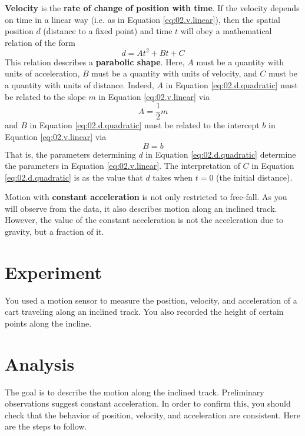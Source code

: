 \textbf{Velocity} is the \textbf{rate of change of position with time}. If the velocity depends on time in a linear way (i.e. as in Equation \ref{eq:02.v.linear}), then the spatial position $d$ (distance to a fixed point) and time $t$ will obey a mathematical relation of the form
\begin{equation}
    d = A t^{2} + B t + C
    \label{eq:02.d.quadratic}
\end{equation}
This relation describes a \textbf{parabolic shape}. Here, $A$ must be a quantity with units of acceleration, $B$ must be a quantity with units of velocity, and $C$ must be a quantity with units of distance. Indeed, $A$ in Equation \ref{eq:02.d.quadratic} must be related to the slope $m$ in Equation \ref{eq:02.v.linear} via
\begin{equation}
    A = \frac{1}{2} m
\end{equation}
and $B$ in Equation \ref{eq:02.d.quadratic} must be related to the intercept $b$ in Equation \ref{eq:02.v.linear} via
\begin{equation}
    B = b
\end{equation}
That is, the parameters determining $d$ in Equation \ref{eq:02.d.quadratic} determine the parameters in Equation \ref{eq:02.v.linear}. The interpretation of $C$ in Equation \ref{eq:02.d.quadratic} is as the value that $d$ takes when $t = 0$ (the initial distance).

Motion with \textbf{constant acceleration} is not only restricted to free-fall. As you will observe from the data, it also describes motion along an inclined track. However, the value of the constant acceleration is not the acceleration due to gravity, but a fraction of it.
\section{Experiment}
You used a motion sensor to measure the position, velocity, and acceleration of a cart traveling along an inclined track. You also recorded the height of certain points along the incline.
\section{Analysis}
The goal is to describe the motion along the inclined track. Preliminary observations suggest constant acceleration. In order to confirm this, you should check that the behavior of position, velocity, and acceleration are consistent. Here are the steps to follow.
